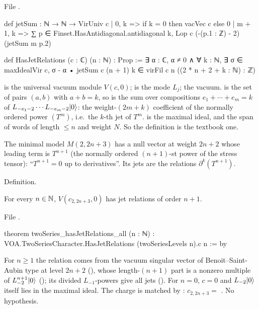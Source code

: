 \noindent File .
\begin{leancode}
def jetSum : ℕ → ℕ → VirUniv c
  | 0, k => if k = 0 then vacVec c else 0
  | m + 1, k => ∑ p ∈ Finset.HasAntidiagonal.antidiagonal k, Lop c (-(p.1 : ℤ) - 2) (jetSum m p.2)

def HasJetRelations (c : ℂ) (n : ℕ) : Prop :=
  ∃ α : ℂ, α ≠ 0 ∧ ∀ k : ℕ, ∃ σ ∈ maxIdealVir c,
    σ - α • jetSum c (n + 1) k ∈ virFil c n ((2 * n + 2 + k : ℕ) : ℤ)
\end{leancode}

\begin{dictionary}
 is the universal vacuum module $V(c,0)$;  is the mode $L_j$;  the vacuum.
 is the set of pairs $(a,b)$ with $a+b=k$, so  is the sum over
compositions $e_1+\cdots+e_m=k$ of $L_{-e_1-2}\cdots L_{-e_m-2}|0\rangle$: the weight-$(2m+k)$ coefficient of the
normally ordered power $(T^m)$, i.e.\ the $k$-th jet of $T^m$.  is the maximal ideal, and
 the span of words of length $\le n$ and weight $N$. So the definition is the textbook one.
\end{dictionary}

\begin{physics}
The minimal model $M(2,2n+3)$ has a null vector at weight $2n+2$ whose leading term is $T^{n+1}$ (the normally ordered
$(n+1)$-st power of the stress tensor): ``$T^{n+1}=0$ up to derivatives''. Its jets are the relations $\partial^k(T^{n+1})$.
\end{physics}

\begin{status}
Definition.
\end{status}

\begin{theorem}\label{l29:thm:jetrel}
For every $n\in{\mathbb{N}}$, $V(c_{2,2n+3},0)$ has jet relations of order $n+1$.
\end{theorem}

\noindent File .
\begin{leancode}
theorem twoSeries_hasJetRelations_all (n : ℕ) :
    VOA.TwoSeriesCharacter.HasJetRelations (twoSeriesLevels n).c n := by
\end{leancode}

\begin{dictionary}
For $n\ge1$ the relation comes from the vacuum singular vector of Benoit--Saint-Aubin type at level $2n+2$
(), whose length-$(n+1)$ part is a nonzero multiple of $L_{-2}^{n+1}|0\rangle$
(); its divided $L_{-1}$-powers give all jets (). For $n=0$,
$c=0$ and $L_{-2}|0\rangle$ itself lies in the maximal ideal. The charge is matched by
: $c_{2,2n+3}=$ . No hypothesis.
\end{dictionary}

